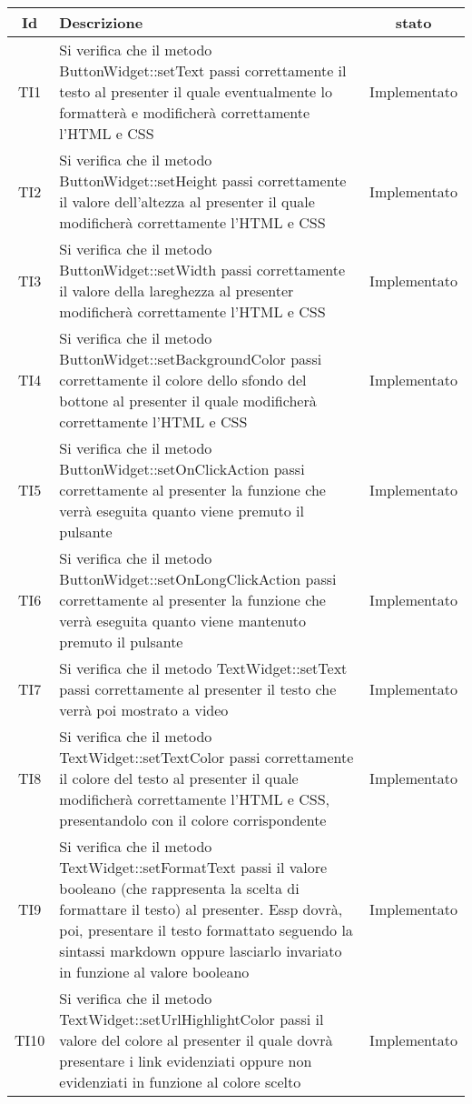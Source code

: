 \begin{center}
	\begin{longtable}{|c|>{\centering}m{10cm}|c|}\hline
		Id & Descrizione & stato \\ \hline
		TI1 & Si verifica che il metodo ButtonWidget::setText passi correttamente il testo al presenter il quale eventualmente lo formatterà e modificherà correttamente l'HTML e CSS & Implementato \\ \hline
		TI2 & Si verifica che il metodo ButtonWidget::setHeight passi correttamente il valore dell'altezza al presenter il quale modificherà correttamente l'HTML e CSS & Implementato \\ \hline
		TI3 & Si verifica che il metodo ButtonWidget::setWidth passi correttamente il valore della lareghezza al presenter modificherà correttamente l'HTML e CSS & Implementato \\ \hline
		TI4 & Si verifica che il metodo ButtonWidget::setBackgroundColor passi correttamente il colore dello sfondo del bottone al presenter il quale modificherà correttamente l'HTML e CSS & Implementato \\ \hline
		TI5 & Si verifica che il metodo ButtonWidget::setOnClickAction passi correttamente al presenter la funzione che verrà eseguita quanto viene premuto il pulsante & Implementato \\ \hline
		TI6 & Si verifica che il metodo ButtonWidget::setOnLongClickAction passi correttamente al presenter la funzione che verrà eseguita quanto viene mantenuto premuto il pulsante & Implementato \\ \hline
		TI7 & Si verifica che il metodo TextWidget::setText passi correttamente al presenter il testo che verrà poi mostrato a video & Implementato \\ \hline
		TI8 & Si verifica che il metodo TextWidget::setTextColor passi correttamente il colore del testo al presenter il quale modificherà correttamente l'HTML e CSS, presentandolo con il colore corrispondente & Implementato \\ \hline
		TI9 & Si verifica che il metodo TextWidget::setFormatText passi il valore booleano (che rappresenta la scelta di formattare il testo) al presenter. Essp dovrà, poi, presentare il testo formattato seguendo la sintassi markdown oppure lasciarlo invariato in funzione al valore booleano & Implementato \\ \hline
		TI10 & Si verifica che il metodo TextWidget::setUrlHighlightColor passi il valore del colore al presenter il quale dovrà presentare i link evidenziati oppure non evidenziati in funzione al colore scelto & Implementato \\ \hline

\end{longtable}
\end{center}
